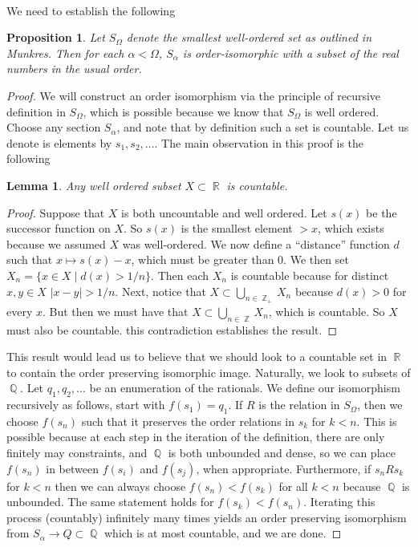 \documentclass{article}
\DeclareMathOperator{\Z}{\mathbb{Z}}
\DeclareMathOperator{\Q}{\mathbb{Q}}
\DeclareMathOperator{\R}{\mathbb{R}}
\DeclareMathOperator{\suchthat}{\mathrel{|}}
\newcommand{\problem}[1]{\noindent{\textbf{Problem #1}}\\}
\newtheorem*{lem}{Lemma}
\newtheorem*{prop}{Proposition}
\begin{document}
\problem{}
We need to establish the following \\
\begin{prop}
Let $S_\Omega$ denote the smallest well-ordered set as outlined in Munkres. Then for each $\alpha < \Omega$, $S_\alpha$ is order-isomorphic with a subset of the real numbers in the usual order. 
\end{prop}
\begin{proof}
We will construct an order isomorphism via the principle of recursive definition in $S_\Omega$, which is possible because we know that $S_\Omega$ is well ordered. Choose any section $S_\alpha$, and note that by definition such a set is countable. Let us denote is elements by $s_1,s_2, \ldots$. The main observation in this proof is the following
\begin{lem}
Any well ordered subset $X \subset \R$ is countable. 
\end{lem}
\begin{proof}
Suppose that $X$ is both uncountable and well ordered. Let $s(x)$ be the successor function on $X$. So $s(x)$ is the smallest element $> x$, which exists because we assumed $X$ was well-ordered. We now define a ``distance'' function $d$ such that $x \mapsto s(x) - x$, which must be greater than 0. We then set $X_n = \{x \in X \suchthat d(x) > 1/n\}$. Then each $X_n$ is countable because for distinct $x,y \in X$ $|x - y| > 1/n$. Next, notice that $X \subset \bigcup_{n\in \Z_+} X_n$ because $d(x) > 0$ for every $x$. But then we must have that $X \subset \bigcup_{n\in \Z} X_n$, which is countable. So $X$ must also be countable. this contradiction establishes the result.
\end{proof}
This result would lead us to believe that we should look to a countable set in $\R$ to contain the order preserving isomorphic image. Naturally, we look to subsets of $\Q$. Let $q_1,q_2,\ldots$ be an enumeration of the rationals. We define our isomorphism recursively as follows, start with $f(s_1) = q_1$. If $R$ is the relation in $S_\Omega$, then we choose $f(s_n)$ such that it preserves the order relations in $s_k$ for $k < n$. This is possible because at each step in the iteration of the definition, there are only finitely may constraints, and $\Q$ is both unbounded and dense, so we can place $f(s_n)$ in between $f(s_i)$ and $f(s_j)$, when appropriate. Furthermore, if $s_n R s_k$ for $k < n$ then we can always choose $f(s_n) < f(s_k)$ for all $k < n$ because $\Q$ is unbounded. The same statement holds for $f(s_k) < f(s_n)$. Iterating this process (countably) infinitely many times yields an order preserving isomorphism from $S_\alpha \to Q \subset \Q$ which is at most countable, and we are done. 
\end{proof}
\end{document}
